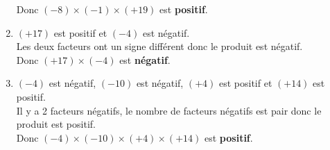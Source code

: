 \begin{corrige}
\begin{multicols}
\begin{enumerate}
           Donc $ (-8) \times (-1) \times (+19) $ est {\bfseries \color[HTML]{f15929}positif}.
               \item $ (+17) $ est positif et $ (-4) $ est négatif.\\
            Les deux facteurs ont un signe différent donc le produit est négatif.\\
           Donc $ (+17) \times (-4) $ est {\bfseries \color[HTML]{f15929}négatif}.
               \item $ (-4) $ est négatif, $ (-10) $ est négatif, $ (+4) $ est positif et $ (+14) $ est positif.\\
            Il y a 2 facteurs négatifs, le nombre de facteurs négatifs est pair donc le produit est positif.\\
           Donc $ (-4) \times (-10) \times (+4) \times (+14) $ est {\bfseries \color[HTML]{f15929}positif}.
        \end{enumerate}
    \end{multicols}
\end{corrige}